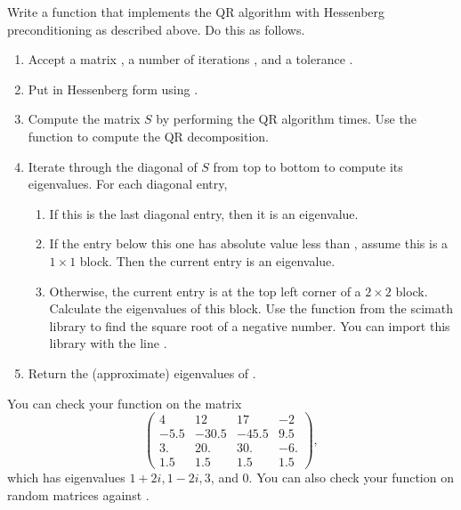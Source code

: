 \begin{problem}
Write a function that implements the QR algorithm with Hessenberg preconditioning as described above. 
Do this as follows.
\begin{enumerate}
\item Accept a matrix , a number of iterations , and a tolerance .
\item Put  in Hessenberg form using .
\item Compute the matrix $S$ by performing the QR algorithm  times. 
Use the function  to compute the QR decomposition.
\item Iterate through the diagonal of $S$ from top to bottom to compute its eigenvalues. 
For each diagonal entry,
\begin{enumerate}
\item If this is the last diagonal entry, then it is an eigenvalue.
\item If the entry below this one has absolute value less than , assume this is a $1\times 1$ block. 
Then the current entry is an eigenvalue.
\item Otherwise, the current entry is at the top left corner of a $2 \times 2$ block. 
Calculate the eigenvalues of this block. 
Use the  function from the scimath library to find the square root of a negative number. 
You can import this library with the line .
\end{enumerate}
\item Return the (approximate) eigenvalues of .
\end{enumerate}
You can check your function on the matrix
\[
\begin{pmatrix}
 4 &  12 & 17 &  -2 \\
-5.5& -30.5 & -45.5 &  9.5\\
 3. &  20. & 30. &  -6. \\
1.5 &  1.5&   1.5&   1.5
       \end{pmatrix},
\]
which has eigenvalues $1+2i, 1-2i, 3$, and 0. You can also check your function on random matrices against .
\label{prob:qr_solver}
\end{problem}

